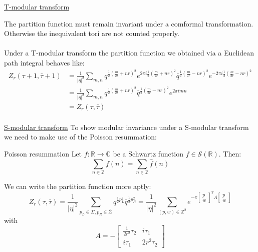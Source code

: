\documentclass[11pt,aspectratio=169]{beamer}
\begin{document}
\begin{frame}{\underline{T-modular transform}}

	The partition function must remain invariant under a comformal transformation. Otherwise the inequivalent tori are not counted properly. 
	\\~\\
	Under a T-modular transform the partition function we obtained via a Euclidean path integral behaves like:
	\begin{align*}
		Z_r (\tau + 1, \bar{\tau} + 1) &= \frac{1}{|\eta|^2} \sum_{m, n} q^{\frac{1}{2}(\frac{m}{2r} + nr)^2}e^{2\pi i \frac{1}{2}(\frac{m}{2r} + nr)^2}
		\bar{q}^{\frac{1}{2}(\frac{m}{2r} - nr)^2}e^{-2\pi i \frac{1}{2}(\frac{m}{2r} - nr)^2} \\
		&= \frac{1}{|\eta|^2} \sum_{m, n} q^{\frac{1}{2}(\frac{m}{2r} + nr)^2}\bar{q}^{\frac{1}{2}(\frac{m}{2r} - nr)^2}e^{2 \pi i mn} \\
		&= Z_r (\tau, \bar{\tau}) \\
	\end{align*}

	
\end{frame}

\begin{frame}{\underline{S-modular transform}}
	To show modular invariance under a S-modular transform we need to make use of the Poisson resummation:
	\begin{block}{Poisson resummation}
		Let $f: \mathbb{R} \rightarrow \mathbb{C}$ be a Schwartz function $f \in \mathcal{S}(\mathbb{R})$.
		Then:
		\begin{equation}
			\sum_{n\in\mathbb{Z}} f(n) = \sum_{n\in\mathbb{Z}} \hat{f}(n)
		\end{equation}
	\end{block}
	We can write the partition function more aptly:
	\begin{equation}
		Z_r (\tau, \bar{\tau}) = \frac{1}{|\eta|^2} \sum_{p_L\in\Sigma, p_R\in\bar{\Sigma}} q^{\frac{1}{2}p_L^2}\bar{q}^{\frac{1}{2}p_R^2} = \frac{1}{|\eta|^2}\sum_{(p, w)\in\mathbb{Z}^2}e^{-\pi\begin{bmatrix} p \\ w \end{bmatrix}^T A \begin{bmatrix} p \\ w \end{bmatrix}}
	\end{equation}
	with 
	\begin{equation}
		A = -\begin{bmatrix} \frac{1}{2r^2}\tau_2 & i \tau_1 \\ i \tau_1 & 2r^2 \tau_2 \end{bmatrix}
	\end{equation}
\end{frame}
\end{document}

